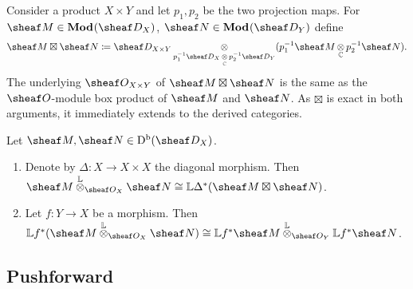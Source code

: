 \documentclass[number-in-sections,a4paper]{notes}
\begin{document}
Consider a product $X \times Y$ and let $p_1, p_2$ be the two projection maps.
For $\sheaf M \in \catDMod{X}$, $\sheaf N \in \catDMod{Y}$ define
\[
    \sheaf M \boxtimes \sheaf N \coloneqq \sD_{X \times Y} \mathop{\otimes}_{p_1^{-1}\sD_X \mathop{\otimes}\limits_\CC p_2^{-1}\sD_Y} (p_1^{-1}\sheaf M \mathop\otimes_\CC p_2^{-1}\sheaf N).
\]
The underlying $\sO_{X \times Y}$ of $\sheaf M \boxtimes \sheaf N$ is the same as the $\sO$-module box product of $\sheaf M$ and $\sheaf N$.
As $\boxtimes$ is exact in both arguments, it immediately extends to the derived categories.

\begin{Lemma}\label{lem:tensor_and_boxtensor}
    Let $\sheaf M, \sheaf N \in \catDbDMod{X}$.
    \begin{enumerate}
        \item Denote by $\Delta\colon X \to X \times X$ the diagonal morphism.
            Then $\sheaf M \Lotimes_{\sO_X} \sheaf N \cong \LL\Delta^*(\sheaf M \boxtimes \sheaf N)$.
        \item Let $f \colon Y \to X$ be a morphism.
            Then $\LL f^*(\sheaf M \Lotimes_{\sO_X} \sheaf N) \cong \LL f^*\sheaf M \Lotimes_{\sO_Y} \LL f^*\sheaf N$.
    \end{enumerate}
\end{Lemma}

\subsection{Pushforward}
\end{document}
